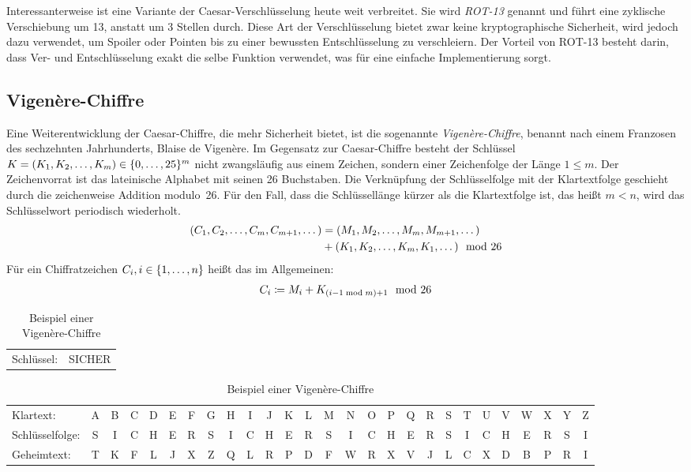 Interessanterweise ist eine Variante der Caesar-Verschlüsselung heute weit verbreitet. Sie wird \emph{ROT-13} genannt und führt eine zyklische Verschiebung
um 13, anstatt um 3 Stellen durch. Diese Art der Verschlüsselung bietet zwar keine kryptographische Sicherheit, wird jedoch dazu verwendet, um Spoiler oder Pointen bis zu einer bewussten Entschlüsselung zu verschleiern. Der Vorteil von ROT-13 besteht darin, dass Ver- und
Entschlüsselung exakt die selbe Funktion verwendet, was für eine einfache Implementierung sorgt.

\subsection{Vigenère-Chiffre}
\label{ssec:vigenere}
Eine Weiterentwicklung der Caesar-Chiffre, die mehr Sicherheit bietet, ist die sogenannte \emph{Vigenère-Chiffre}, benannt nach einem Franzosen des
sechzehnten Jahrhunderts, Blaise de Vigenère. Im Gegensatz zur Caesar-Chiffre besteht der Schlüssel $K = (K_{1},K_{2},\dots,K_{m}) \in \{0,\dots,25\}^{m}$ nicht zwangsläufig aus einem Zeichen, sondern einer Zeichenfolge der Länge $1 \leq m$.
Der Zeichenvorrat ist das lateinische Alphabet mit seinen 26 Buchstaben. Die Verknüpfung der Schlüsselfolge mit der Klartextfolge geschieht durch die zeichenweise Addition modulo~26. Für den Fall, dass die Schlüssellänge kürzer als die Klartextfolge ist, das heißt $m < n$, wird das Schlüsselwort periodisch wiederholt.
\begin{align*}
	\begin{split}
		(C_{1},C_{2},\dots,C_{m},C_{m+1},\dots) &= (M_{1},M_{2},\dots,M_{m},M_{m+1},\dots)\\ 
		&+ (K_{1},K_{2},\dots,K_{m},K_{1},\dots) \mod 26
	\end{split}
\end{align*}
Für ein Chiffratzeichen $C_{i}, i \in \{1,\dots,n\}$ heißt das im Allgemeinen:
\begin{align*}
	C_{i} \coloneqq M_{i} + K_{(i-1 \bmod m)+1} \mod 26
\end{align*}

\begin{table}[h]
	\centering
	\setlength{\tabcolsep}{2pt}
	\begin{tabular}{ll}
		Schlüssel: 
		& SICHER
	\end{tabular}
	\begin{tabular}{l*{26}{c}}
		Klartext:
		&A&B&C&D&E&F&G&H&I&J&K&L&M&N&O&P&Q&R&S&T&U&V&W&X&Y&Z\\
		Schlüsselfolge:
		&S&I&C&H&E&R&S&I&C&H&E&R&S&I&C&H&E&R&S&I&C&H&E&R&S&I\\
		Geheimtext:
		&T&K&F&L&J&X&Z&Q&L&R&P&D&F&W&R&X&V&J&L&C&X&D&B&P&R&I\\
	\end{tabular}
	\caption{Beispiel einer Vigenère-Chiffre}
\end{table}

